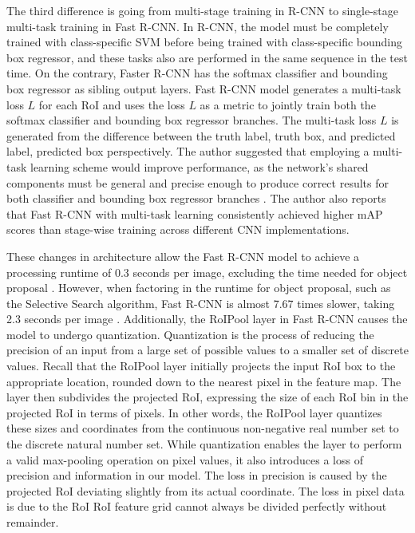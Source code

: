 The third difference is going from multi-stage training in R-CNN to single-stage multi-task training in Fast R-CNN. In R-CNN, the model must be completely trained with class-specific SVM before being trained with class-specific bounding box regressor, and these tasks also are performed in the same sequence in the test time. On the contrary, Faster R-CNN has the softmax classifier and bounding box regressor as sibling output layers. Fast R-CNN model generates a multi-task loss $L$ for each RoI and uses the loss $L$ as a metric to jointly train both the softmax classifier and bounding box regressor branches. The multi-task loss $L$ is generated from the difference between the truth label, truth box, and predicted label, predicted box perspectively. The author suggested that employing a multi-task learning scheme would improve performance, as the network's shared components must be general and precise enough to produce correct results for both classifier and bounding box regressor branches \cite{fast_rcnn_og}. The author also reports that Fast R-CNN with multi-task learning consistently achieved higher mAP scores than stage-wise training across different CNN implementations.

These changes in architecture allow the Fast R-CNN model to achieve a processing runtime of 0.3 seconds per image, excluding the time needed for object proposal \cite{fast_rcnn_og}. However, when factoring in the runtime for object proposal, such as the Selective Search algorithm, Fast R-CNN is almost 7.67 times slower, taking 2.3 seconds per image \cite{selective_search_2013}. Additionally, the RoIPool layer in Fast R-CNN causes the model to undergo quantization. Quantization is the process of reducing the precision of an input from a large set of possible values to a smaller set of discrete values. Recall that the RoIPool layer initially projects the input RoI box to the appropriate location, rounded down to the nearest pixel in the feature map. The layer then subdivides the projected RoI, expressing the size of each RoI bin in the projected RoI in terms of pixels. In other words, the RoIPool layer quantizes these sizes and coordinates from the continuous non-negative real number set to the discrete natural number set. While quantization enables the layer to perform a valid max-pooling operation on pixel values, it also introduces a loss of precision and information in our model. The loss in precision is caused by the projected RoI deviating slightly from its actual coordinate. The loss in pixel data is due to the RoI RoI feature grid cannot always be divided perfectly without remainder.

